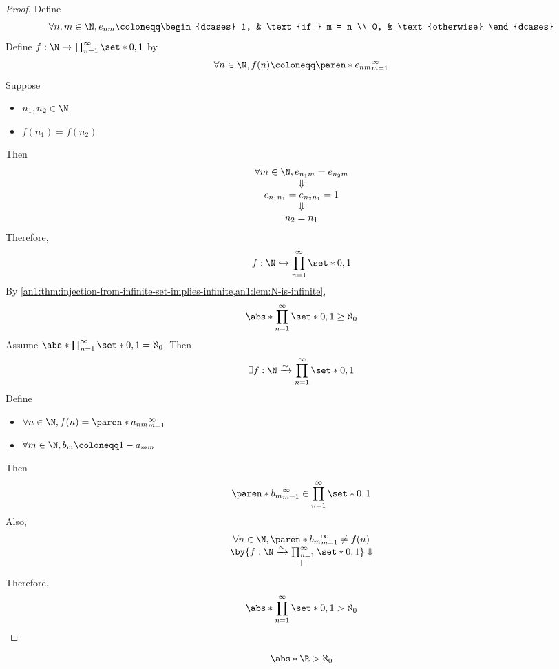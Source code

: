 \begin{proof}
  Define
  \[
    \forall n, m \in \N, e_{nm} \coloneqq \begin{dcases}
      1, & \text{if } m = n \\
      0, & \text{otherwise}
    \end{dcases}
  \]
  Define $f: \N \to \prod_{n = 1}^{\infty} \set*{0, 1}$ by
  \[
    \forall n \in \N, f(n) \coloneqq \paren*{e_{nm}}_{m = 1}^{\infty}
  \]
  Suppose
  \begin{itemize}
    \item $n_{1}, n_{2} \in \N$
    \item $f(n_{1}) = f(n_{2})$
  \end{itemize}
  Then
  \[
    \begin{array}{c}
      \forall m \in \N, e_{n_{1}m} = e_{n_{2}m} \\
      \Downarrow                                \\
      e_{n_{1}n_{1}} = e_{n_{2}n_{1}} = 1       \\
      \Downarrow                                \\
      n_{2} = n_{1}
    \end{array}
  \]
  Therefore,
  \[
    f: \N \hookrightarrow \prod_{n = 1}^{\infty} \set*{0, 1}
  \]
  By \cref{an1:thm:injection-from-infinite-set-implies-infinite,an1:lem:N-is-infinite},
  \[
    \abs*{\prod_{n = 1}^{\infty} \set*{0, 1}} \geq \aleph_{0}
  \]
  Assume $\abs*{\prod_{n = 1}^{\infty} \set*{0, 1}} = \aleph_{0}$. Then
  \[
    \exists f: \N \xrightarrow{\sim} \prod_{n = 1}^{\infty} \set*{0, 1}
  \]
  Define
  \begin{itemize}
    \item $\forall n \in \N, f(n) = \paren*{a_{nm}}_{m = 1}^{\infty}$
    \item $\forall m \in \N, b_{m} \coloneqq 1 - a_{mm}$
  \end{itemize}
  Then
  \[
    \paren*{b_{m}}_{m = 1}^{\infty} \in \prod_{n = 1}^{\infty} \set*{0, 1}
  \]
  Also,
  \[
    \begin{array}{c}
      \forall n \in \N, \paren*{b_{m}}_{m = 1}^{\infty} \neq f(n)                              \\
      \by{\ensuremath{f: \N \xrightarrow{\sim} \prod_{n = 1}^{\infty} \set*{0, 1}}} \Downarrow \\
      \bot
    \end{array}
  \]
  Therefore,
  \[
    \abs*{\prod_{n = 1}^{\infty} \set*{0, 1}} > \aleph_{0}
  \]
\end{proof}

\begin{theorem} \label{an1:thm:R-is-uncountable}
  \[
    \abs*{\R} > \aleph_{0}
  \]
\end{theorem}

